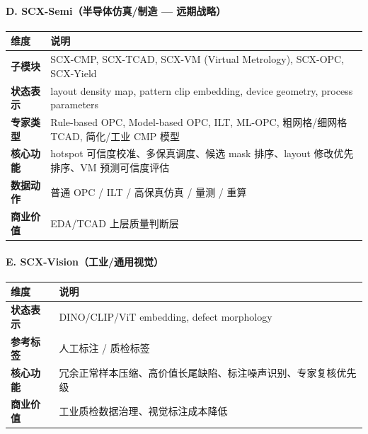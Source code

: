 \documentclass[
  12pt,
]{ctexart}
\begin{document}
\paragraph{D. SCX-Semi（半导体仿真/制造 ---
远期战略）}\label{d.-scx-semiux534aux5bfcux4f53ux4effux771fux5236ux9020-ux8fdcux671fux6218ux7565}

\begin{longtable}[]{@{}
  >{\raggedright\arraybackslash}p{}
  >{\raggedright\arraybackslash}p{}@{}}
\toprule\noalign{}
\begin{minipage}[b]{\linewidth}\raggedright
维度
\end{minipage} & \begin{minipage}[b]{\linewidth}\raggedright
说明
\end{minipage} \\
\midrule\noalign{}
\endhead
\bottomrule\noalign{}
\endlastfoot
\textbf{子模块} & SCX-CMP, SCX-TCAD, SCX-VM (Virtual Metrology),
SCX-OPC, SCX-Yield \\
\textbf{状态表示} & layout density map, pattern clip embedding, device
geometry, process parameters \\
\textbf{专家类型} & Rule-based OPC, Model-based OPC, ILT, ML-OPC,
粗网格/细网格 TCAD, 简化/工业 CMP 模型 \\
\textbf{核心功能} & hotspot 可信度校准、多保真调度、候选 mask
排序、layout 修改优先排序、VM 预测可信度评估 \\
\textbf{数据动作} & 普通 OPC / ILT / 高保真仿真 / 量测 / 重算 \\
\textbf{商业价值} & EDA/TCAD 上层质量判断层 \\
\end{longtable}

\paragraph{E.
SCX-Vision（工业/通用视觉）}\label{e.-scx-visionux5de5ux4e1aux901aux7528ux89c6ux89c9}

\begin{longtable}[]{@{}
  >{\raggedright\arraybackslash}p{}
  >{\raggedright\arraybackslash}p{}@{}}
\toprule\noalign{}
\begin{minipage}[b]{\linewidth}\raggedright
维度
\end{minipage} & \begin{minipage}[b]{\linewidth}\raggedright
说明
\end{minipage} \\
\midrule\noalign{}
\endhead
\bottomrule\noalign{}
\endlastfoot
\textbf{状态表示} & DINO/CLIP/ViT embedding, defect morphology \\
\textbf{参考标签} & 人工标注 / 质检标签 \\
\textbf{核心功能} &
冗余正常样本压缩、高价值长尾缺陷、标注噪声识别、专家复核优先级 \\
\textbf{商业价值} & 工业质检数据治理、视觉标注成本降低 \\
\end{longtable}
\end{document}
